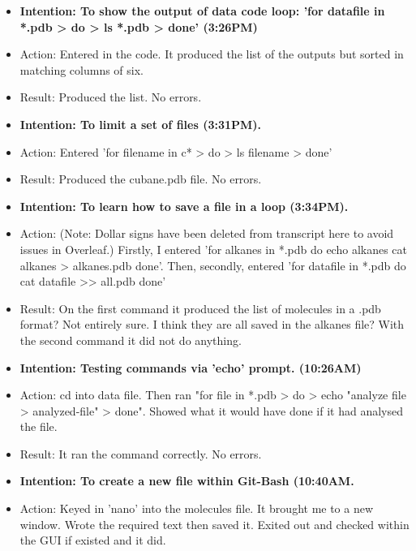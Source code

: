 \documentclass[a4paper,12pt]{article}
\begin{document}
\begin{itemize}
\begin{itemize}
\item \textbf {Intention: To show the output of data code loop: 'for datafile in *.pdb
> do
>    ls *.pdb
> done' (3:26PM)}

\item Action: Entered in the code. It produced the list of the outputs but sorted in matching columns of six. 

\item Result: Produced the list. No errors.

\item \textbf {Intention: To limit a set of files (3:31PM).}

\item Action: Entered 'for filename in c*
> do
>    ls filename
> done'

\item Result: Produced the cubane.pdb file. No errors.

\item \textbf{Intention: To learn how to save a file in a loop (3:34PM).}

\item Action: (Note: Dollar signs have been deleted from transcript here to avoid issues in Overleaf.) Firstly, I entered 'for alkanes in *.pdb
do
    echo alkanes
    cat alkanes > alkanes.pdb
done'. Then, secondly, entered 'for datafile in *.pdb
do
    cat datafile >> all.pdb
done'

\item Result: On the first command it produced the list of molecules in a .pdb format? Not entirely sure. I think they are all saved in the alkanes file? With the second command it did not do anything. 

\item \textbf{Intention: Testing commands via 'echo' prompt. (10:26AM)}

\item Action: cd into data file. Then ran 
 "for file in *.pdb
> do
>   echo "analyze file > analyzed-file"
> done". Showed what it would have done if it had analysed the file. 

\item Result: It ran the command correctly. No errors.

\item \textbf{Intention: To create a new file within Git-Bash (10:40AM.}

\item Action: Keyed in 'nano' into the molecules file. It brought me to a new window. Wrote the required text then saved it. Exited out and checked within the GUI if existed and it did.


\end{itemize}
\end{itemize}
\end{document}

